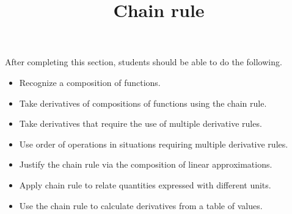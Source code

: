 \documentclass{ximera}
\title{Chain rule}
\begin{document}
\begin{abstract}
\end{abstract}

\maketitle

\begin{sectionOutcomes}

After completing this section, students should be able to do the following.

\begin{itemize}
	\item Recognize a composition of functions.
	\item Take derivatives of compositions of functions using the chain rule.
	\item Take derivatives that require the use of multiple derivative rules.
	\item Use order of operations in situations requiring multiple derivative rules.
    \item Justify the chain rule via the composition of linear approximations.
    \item Apply chain rule to relate quantities expressed with different units.
	\item Use the chain rule to calculate derivatives from a table of values.        
\end{itemize}

\end{sectionOutcomes}
\end{document}
